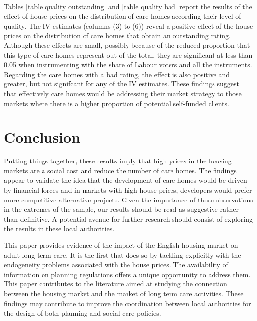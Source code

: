 \documentclass[12pt,letterpaper]{article}
\begin{document}
 {}\\
  {}
  
  Tables \ref{table quality outstanding} and \ref{table quality bad} report the results of the effect of house prices on 
  the distribution of care homes according their level of quality. The IV estimates (columns (3) to (6))
reveal a positive effect of the house prices on the distribution of care homes 
that obtain an outstanding rating. Although these effects are small, possibly because of the 
reduced proportion that this type of care homes represent out of the total, they are significant at less than 0.05 
when instrumenting with the share of Labour voters and all the instruments. 
Regarding the care homes with a bad rating, the effect is also positive and greater, but not 
signifcant for any of the IV estimates. These findings suggest that effectively care 
homes would be addressing their market strategy to those markets where there is 
a higher proportion of potential self-funded clients. 

\section{Conclusion}
\label{sec: conclusion}

Putting things together, these results imply that high prices in the housing markets 
are a social cost and reduce the number of care homes. The findings appear to 
validate the idea that the development of care homes would be driven by 
financial forces and in markets with high house prices, developers would 
prefer more competitive alternative projects. Given the importance of those observations in the extremes of the sample, 
our results should be read as suggestive rather than definitive. A potential 
avenue for further research should consist of exploring the results in these 
local authorities. 

This paper provides evidence of the impact of the English housing market on 
adult long term care. It is the first that does so by tackling explicitly 
with the endogeneity problems associated with the house prices. The availability of information on planning 
regulations offers a unique opportunity to address them. This paper contributes to the literature aimed at studying
 the connection between the housing market and the
 market of long term care activities. These findings may contribute to improve the coordination between local
  authorities  for the design of both planning and social care policies. 
\end{document}
